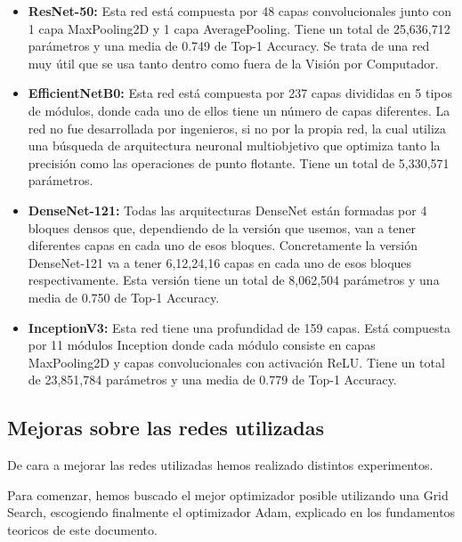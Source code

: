 \begin{itemize}


\item{\textbf{ResNet-50:}\cite{resnet50} Esta red está compuesta por 48 capas convolucionales junto con 1 capa MaxPooling2D y 1 capa AveragePooling. Tiene un total de 25,636,712 parámetros y una media de 0.749 de Top-1 Accuracy. Se trata de una red muy útil que se usa tanto dentro como fuera de la Visión por Computador.}


\item{\textbf{EfficientNetB0:}\cite{efficientnetb0} Esta red está compuesta por 237 capas divididas en 5 tipos de módulos, donde cada uno de ellos tiene un número de capas diferentes. La red no fue desarrollada por ingenieros, si no por la propia red, la cual utiliza una búsqueda de arquitectura neuronal multiobjetivo que optimiza tanto la precisión como las operaciones de punto flotante. Tiene un total de 5,330,571 parámetros.}

\item{\textbf{DenseNet-121:}\cite{densenet121} Todas las arquitecturas DenseNet están formadas por 4 bloques densos que, dependiendo de la versión que usemos, van a tener diferentes capas en cada uno de esos bloques. Concretamente la versión DenseNet-121 va a tener 6,12,24,16 capas en cada uno de esos bloques respectivamente. Esta versión tiene un total de 8,062,504 parámetros y una media de 0.750 de Top-1 Accuracy.}


\item{\textbf{InceptionV3:}\cite{inceptionv3} Esta red tiene una profundidad de 159 capas. Está compuesta por 11 módulos Inception donde cada módulo consiste en capas MaxPooling2D y capas convolucionales con activación ReLU. Tiene un total de 23,851,784 parámetros y una media de 0.779 de Top-1 Accuracy.}


\end{itemize}

\newpage

\subsection{Mejoras sobre las redes utilizadas}

De cara a mejorar las redes utilizadas hemos realizado distintos experimentos.

Para comenzar, hemos buscado el mejor optimizador posible utilizando una Grid Search, escogiendo finalmente el optimizador Adam, explicado en los fundamentos teoricos de este documento.


